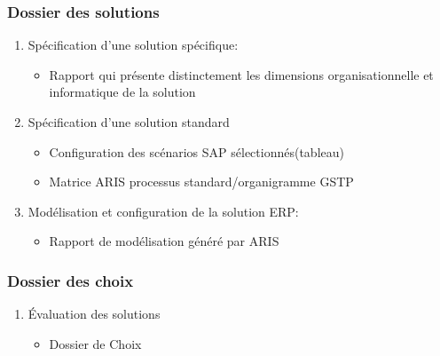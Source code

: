 \documentclass[twoside]{article}
\begin{document}
\subsubsection{Dossier des solutions}
		\begin{enumerate}
			\item Spécification d'une solution spécifique:
				\begin{itemize}
					\item Rapport qui présente distinctement les dimensions
                            organisationnelle et informatique de la solution
				\end{itemize}
			\item Spécification d'une solution standard
				\begin{itemize} 
					\item Configuration des scénarios SAP sélectionnés(tableau)
					\item Matrice ARIS processus standard/organigramme GSTP 
				\end{itemize}
			\item Modélisation et configuration de la solution ERP:
				\begin{itemize} 
					\item Rapport de modélisation généré par ARIS
				\end{itemize}
		\end{enumerate}
		
\subsubsection{Dossier des choix}
		\begin{enumerate}
			\item Évaluation des solutions
				\begin{itemize}
					\item Dossier de Choix
				\end{itemize}
		\end{enumerate}
\end{document}
